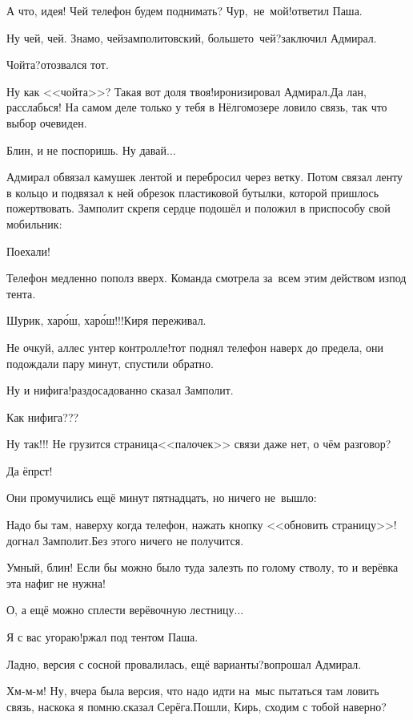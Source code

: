 \diagdash А что, идея! Чей телефон будем поднимать? Чур,~не~мой!\mdash ответил Паша.

\diagdash Ну чей, чей. Знамо, чей\mdash замполитовский, больше\sdash то~чей?\mdash заключил Адмирал.

\diagdash Чойта?\mdash отозвался тот.

\diagdash Ну как <<чойта>>? Такая вот доля твоя!\mdash иронизировал Адмирал.\mdash Да лан, расслабься! На самом деле только у тебя в Нёлгомозере ловило связь, так что выбор очевиден.

\diagdash Блин, и не поспоришь. Ну давай$\ldots$

Адмирал обвязал камушек лентой и перебросил через ветку. Потом связал ленту в кольцо и подвязал к ней обрезок пластиковой бутылки, которой пришлось пожертвовать. Замполит скрепя сердце подошёл и положил в приспособу свой мобильник:

\diagdash Поехали!

Телефон медленно пополз вверх. Команда смотрела за~всем этим действом из\sdash под тента.

\diagdash Шурик, хар{\'о}ш, хар{\'о}ш!!!\mdash Киря переживал.

\diagdash Не очкуй, аллес унтер контролле!\mdash тот поднял телефон наверх до предела, они подождали пару минут, спустили обратно.

\diagdash Ну и нифига!\mdash раздосадованно сказал Замполит.

\diagdash Как нифига???

\diagdash Ну так!!! Не грузится страница\mdash <<палочек>> связи даже нет, о чём разговор?

\diagdash Да ёпрст!

Они промучились ещё минут пятнадцать, но ничего не~вышло:

\diagdash Надо бы там, наверху когда телефон, нажать кнопку <<обновить страницу>>!\mdash догнал Замполит.\mdash Без этого ничего не получится.

\diagdash Умный, блин! Если бы можно было туда залезть по голому стволу, то и верёвка эта нафиг не нужна!

\diagdash О, а ещё можно сплести верёвочную лестницу$\ldots$

\diagdash Я с вас угораю!\mdash ржал под тентом Паша.

\diagdash Ладно, версия с сосной провалилась, ещё варианты?\mdash вопрошал Адмирал.

\diagdash Хм-м-м! Ну, вчера была версия, что надо идти на~мыс пытаться там ловить связь, наскока я помню.\mdash сказал Серёга.\mdash Пошли, Кирь, сходим с тобой наверно?

